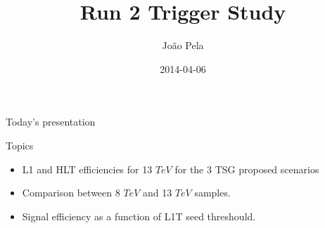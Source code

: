 \documentclass[8pt]{beamer}
\author[J. Pela]{João Pela}
\title{Run 2 Trigger Study}
\institute[ICL]{Imperial College London}
\date{2014-04-06}
\begin{document}
\setlength{\unitlength}{1mm}

\begin{frame}
  \titlepage
\end{frame}

\begin{frame}{Today's presentation}
 
\begin{block}{Topics}
 
\begin{itemize}
  \item L1 and HLT efficiencies for 13 $TeV$ for the 3 TSG proposed scenarios
  \item Comparison between 8 $TeV$ and 13 $TeV$ samples.
  \item Signal efficiency as a function of L1T seed threshould.
\end{itemize}
 
\end{block}

\end{frame}
\end{document}

